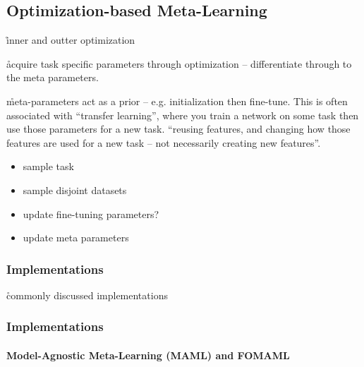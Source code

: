 

\subsection{Optimization-based Meta-Learning}

\r{inner and outter optimization}

\r{acquire task specific parameters through optimization -- differentiate through to the meta parameters.}

\r{meta-parameters act as a prior -- e.g. initialization then fine-tune. This is often associated with ``transfer learning'', where you train a network on some task then use those parameters for a new task. ``reusing features, and changing how those features are used for a new task -- not necessarily creating new features''.}


\begin{itemize}[noitemsep,topsep=0pt]
	\item sample task
	\item sample disjoint datasets
	\item update fine-tuning parameters?
	\item update meta parameters
\end{itemize}

\subsubsection{Implementations}

\r{commonly discussed implementations}

\subsubsection{Implementations}

\paragraph{Model-Agnostic Meta-Learning (MAML) and FOMAML}


